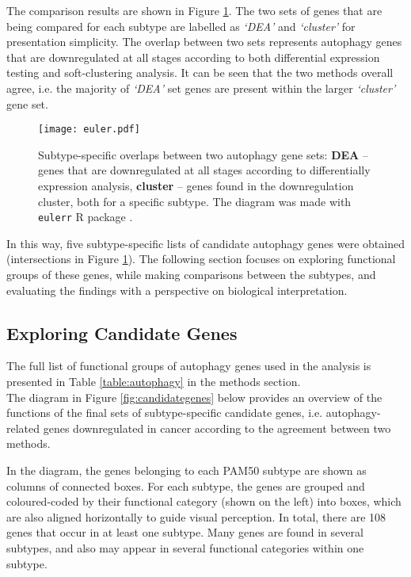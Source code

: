 The comparison results are shown in Figure \ref{fig:overlapdown}. The two sets of genes that are being compared for each subtype are labelled as \textit{‘DEA’} and \textit{‘cluster’ }for presentation simplicity. The overlap between two sets represents autophagy genes that are downregulated at all stages according to both differential expression testing and soft-clustering analysis. It can be seen that the two methods overall agree, i.e. the majority of \textit{‘DEA’} set genes are present within the larger \textit{‘cluster’ }gene set. 

            \begin{figure}[!h]
            \centering
            \texttt{[image: euler.pdf]} 
            \caption[Overlaps between downregulated autophagy genes identified by two methods]{Subtype-specific overlaps between two autophagy gene sets: \textbf{DEA} -- genes that are downregulated at all stages according to differentially expression analysis, \textbf{cluster} -- genes found in the downregulation cluster, both for a specific subtype. The diagram was made with \texttt{eulerr} R package \cite{euler}. }
            \label{fig:overlapdown}
            \end{figure}
            
In this way, five subtype-specific lists of candidate autophagy genes were obtained (intersections in Figure \ref{fig:overlapdown}). The following section focuses on exploring functional groups of these genes, while making comparisons between the subtypes, and evaluating the findings with a perspective on biological interpretation. 


\subsection{Exploring Candidate Genes}

The full list of functional groups of autophagy genes used in the analysis is presented in Table \ref{table:autophagy} in the methods section.\\
The diagram in Figure \ref{fig:candidategenes} below provides an overview of the functions of the final sets of subtype-specific candidate genes, i.e. autophagy-related genes downregulated in cancer according to the agreement between two methods. 

In the diagram, the genes belonging to each PAM50 subtype are shown as columns of connected boxes. For each subtype, the genes are grouped and coloured-coded by their functional category (shown on the left) into boxes, which are also aligned horizontally to guide visual perception. In total, there are 108 genes that occur in at least one subtype. Many genes are found in several subtypes, and also may appear in several functional categories within one subtype. 

